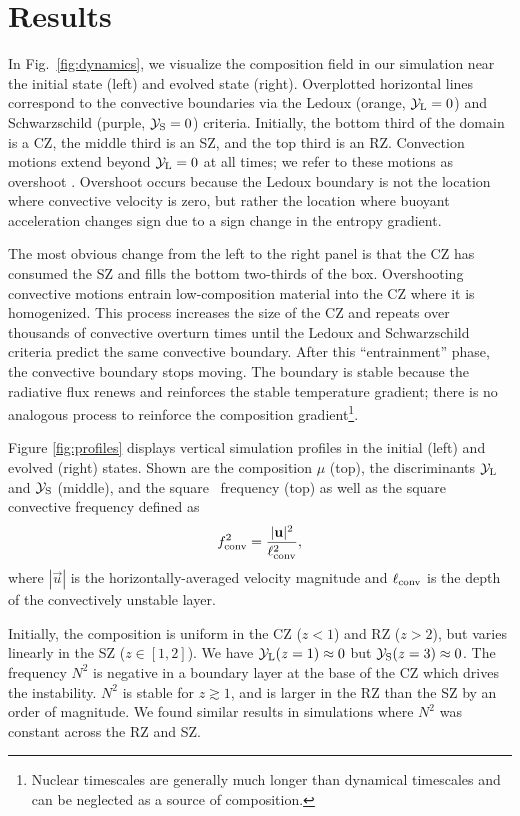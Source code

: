 \section{Results}
\label{sec:results}

In Fig.~\ref{fig:dynamics}, we visualize the composition field in our simulation near the initial state (left) and evolved state (right).
Overplotted horizontal lines correspond to the convective boundaries via the Ledoux (orange, $\mathcal{Y}_{\rm{L}} = 0$) and Schwarzschild (purple, $\mathcal{Y}_{\rm{S}}=0$) criteria.
Initially, the bottom third of the domain is a CZ, the middle third is an SZ, and the top third is an RZ.
Convection motions extend beyond $\mathcal{Y}_{\rm{L}} = 0$ at all times; we refer to these motions as overshoot \citep[which is discussed in][]{korre_etal_2019}.
Overshoot occurs because the Ledoux boundary is not the location where convective velocity is zero, but rather the location where buoyant acceleration changes sign due to a sign change in the entropy gradient.

The most obvious change from the left to the right panel is that the CZ has consumed the SZ and fills the bottom two-thirds of the box.
Overshooting convective motions entrain low-composition material into the CZ where it is homogenized.
This process increases the size of the CZ and repeats over thousands of convective overturn times until the Ledoux and Schwarzschild criteria predict the same convective boundary.
After this ``entrainment'' phase, the convective boundary stops moving.
The boundary is stable because the radiative flux renews and reinforces the stable temperature gradient; there is no analogous process to reinforce the composition gradient\footnote{Nuclear timescales are generally much longer than dynamical timescales and can be neglected as a source of composition.}.

Figure \ref{fig:profiles} displays vertical simulation profiles in the initial (left) and evolved (right) states.
Shown are the composition $\mu$ (top), the discriminants $\mathcal{Y}_{\rm{L}}$ and $\mathcal{Y}_{\rm{S}}$ (middle), and the square \brunt$\,$ frequency (top) as well as the square convective frequency defined as
\begin{equation}
f_{\rm{conv}}^2 = \frac{|\vec{u}|^2}{\ell_{\rm{conv}}^2},
\label{eqn:fconv2}
\end{equation}
where $|\vec{u}|$ is the horizontally-averaged velocity magnitude and $\ell_{\rm{conv}}$ is the depth of the convectively unstable layer.

Initially, the composition is uniform in the CZ ($z < 1$) and RZ ($z > 2$), but varies linearly in the SZ ($z \in [1, 2]$).
We have $\mathcal{Y}_{\rm{L}}(z=1) \approx 0$ but $\mathcal{Y}_{\rm{S}}(z=3) \approx 0$.
The \brunt$\,$ frequency $N^2$ is negative in a boundary layer at the base of the CZ which drives the instability.
$N^2$ is stable for $z \gtrsim 1$, and is larger in the RZ than the SZ by an order of magnitude.
We found similar results in simulations where $N^2$ was constant across the RZ and SZ.

